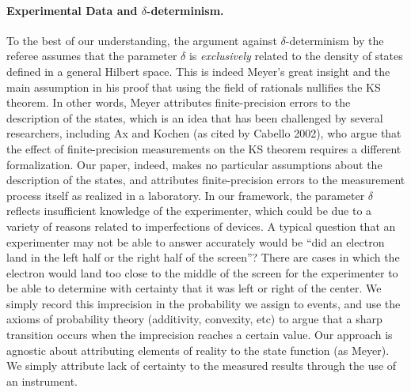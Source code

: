 \documentclass[english,reprint, aps, prl,superscriptaddress, showpacs,
showkeys, longbibliography, amsmath, amssymb, floatfix]{revtex4-1}
\theoremstyle{plain}
\theoremstyle{definition}
\begin{document}
\paragraph*{Experimental Data and $\delta$-determinism.} To the best of
our understanding, the argument against $\delta$-determinism by the
referee assumes that the parameter $\delta$ is \emph{exclusively}
related to the density of states defined in a general Hilbert
space. This is indeed Meyer's great insight and the main assumption in
his proof that using the field of rationals nullifies the KS theorem.
In other words, Meyer attributes finite-precision errors to the
description of the states, which is an idea that has been challenged
by several researchers, including Ax and Kochen (as cited by Cabello
2002), who argue that the effect of finite-precision measurements on
the KS theorem requires a different formalization. Our paper, indeed,
makes no particular assumptions about the description of the states,
and attributes finite-precision errors to the measurement process
itself as realized in a laboratory. In our framework, the parameter
$\delta$ reflects insufficient knowledge of the experimenter, which
could be due to a variety of reasons related to imperfections of
devices. A typical question that an experimenter may not be able to
answer accurately would be ``did an electron land in the left half or
the right half of the screen''? There are cases in which the electron
would land too close to the middle of the screen for the experimenter
to be able to determine with certainty that it was left or right of
the center. We simply record this imprecision in the probability we
assign to events, and use the axioms of probability theory
(additivity, convexity, etc) to argue that a sharp transition occurs
when the imprecision reaches a certain value. Our approach is agnostic
about attributing elements of reality to the state function (as
Meyer). We simply attribute lack of certainty to the measured results
through the use of an instrument.
\end{document}
